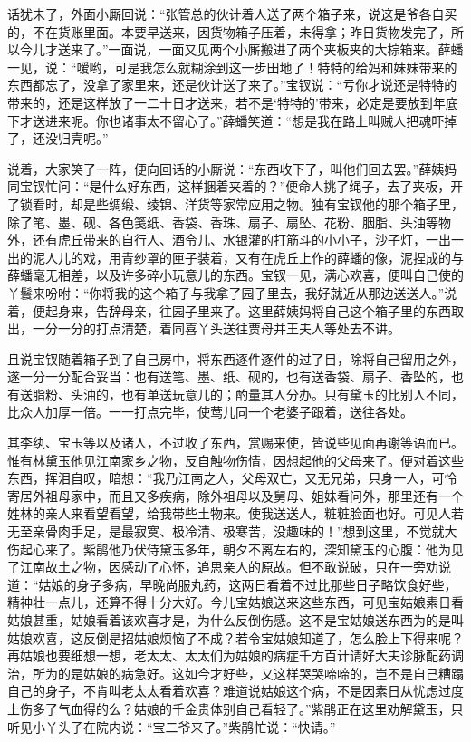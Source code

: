 话犹未了，外面小厮回说：“张管总的伙计着人送了两个箱子来，说这是爷各自买的，不在货账里面。本要早送来，因货物箱子压着，未得拿；昨日货物发完了，所以今儿才送来了。”一面说，一面又见两个小厮搬进了两个夹板夹的大棕箱来。薛蟠一见，说：“嗳哟，可是我怎么就糊涂到这一步田地了！特特的给妈和妹妹带来的东西都忘了，没拿了家里来，还是伙计送了来了。”宝钗说：“亏你才说还是特特的带来的，还是这样放了一二十日才送来，若不是‘特特的’带来，必定是要放到年底下才送进来呢。你也诸事太不留心了。”薛蟠笑道：“想是我在路上叫贼人把魂吓掉了，还没归壳呢。”

说着，大家笑了一阵，便向回话的小厮说：“东西收下了，叫他们回去罢。”薛姨妈同宝钗忙问：“是什么好东西，这样捆着夹着的？”便命人挑了绳子，去了夹板，开了锁看时，却是些绸缎、绫锦、洋货等家常应用之物。独有宝钗他的那个箱子里，除了笔、墨、砚、各色笺纸、香袋、香珠、扇子、扇坠、花粉、胭脂、头油等物外，还有虎丘带来的自行人、酒令儿、水银灌的打筋斗的小小子，沙子灯，一出一出的泥人儿的戏，用青纱罩的匣子装着，又有在虎丘上作的薛蟠的像，泥捏成的与薛蟠毫无相差，以及许多碎小玩意儿的东西。宝钗一见，满心欢喜，便叫自己使的丫鬟来吩咐：“你将我的这个箱子与我拿了园子里去，我好就近从那边送送人。”说着，便起身来，告辞母亲，往园子里来了。这里薛姨妈将自己这个箱子里的东西取出，一分一分的打点清楚，着同喜丫头送往贾母并王夫人等处去不讲。

且说宝钗随着箱子到了自己房中，将东西逐件逐件的过了目，除将自己留用之外，遂一分一分配合妥当：也有送笔、墨、纸、砚的，也有送香袋、扇子、香坠的，也有送脂粉、头油的，也有单送玩意儿的；酌量其人分办。只有黛玉的比别人不同，比众人加厚一倍。一一打点完毕，使莺儿同一个老婆子跟着，送往各处。

其李纨、宝玉等以及诸人，不过收了东西，赏赐来使，皆说些见面再谢等语而已。惟有林黛玉他见江南家乡之物，反自触物伤情，因想起他的父母来了。便对着这些东西，挥泪自叹，暗想：“我乃江南之人，父母双亡，又无兄弟，只身一人，可怜寄居外祖母家中，而且又多疾病，除外祖母以及舅母、姐妹看问外，那里还有一个姓林的亲人来看望看望，给我带些土物来。使我送送人，粧粧脸面也好。可见人若无至亲骨肉手足，是最寂寞、极冷清、极寒苦，没趣味的！”想到这里，不觉就大伤起心来了。紫鹃他乃伏侍黛玉多年，朝夕不离左右的，深知黛玉的心腹：他为见了江南故土之物，因感动了心怀，追思亲人的原故。但不敢说破，只在一旁劝说道：“姑娘的身子多病，早晚尚服丸药，这两日看着不过比那些日子略饮食好些，精神壮一点儿，还算不得十分大好。今儿宝姑娘送来这些东西，可见宝姑娘素日看姑娘甚重，姑娘看着该欢喜才是，为什么反倒伤感。这不是宝姑娘送东西为的是叫姑娘欢喜，这反倒是招姑娘烦恼了不成？若令宝姑娘知道了，怎么脸上下得来呢？再姑娘也要细想一想，老太太、太太们为姑娘的病症千方百计请好大夫诊脉配药调治，所为的是姑娘的病急好。这如今才好些，又这样哭哭啼啼的，岂不是自己糟蹋自己的身子，不肯叫老太太看着欢喜？难道说姑娘这个病，不是因素日从忧虑过度上伤多了气血得的么？姑娘的千金贵体别自己看轻了。”紫鹃正在这里劝解黛玉，只听见小丫头子在院内说：“宝二爷来了。”紫鹃忙说：“快请。”

